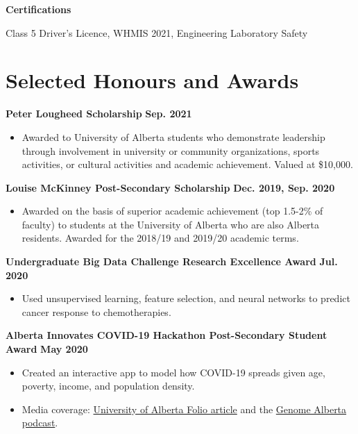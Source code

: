 \documentclass{article}
\begin{document}
\textbf{Certifications} \hfill \parbox[t]{.8\linewidth}{Class 5 Driver's Licence, WHMIS 2021, Engineering Laboratory Safety}


\section*{\textcolor{my_colour}{Selected Honours and Awards}}
\vspace{-.25em} \hrulefill \vspace{.25em}

\textbf{Peter Lougheed Scholarship} \hfill \textbf{Sep. 2021}
\begin{itemize}
    \item Awarded to University of Alberta students who demonstrate leadership through involvement in university or community organizations, sports activities, or cultural activities and academic achievement. Valued at \$10,000.
\end{itemize} \vspace{1em}

\textbf{Louise McKinney Post-Secondary Scholarship} \hfill \textbf{Dec. 2019, Sep. 2020}
\begin{itemize}
    \item Awarded on the basis of superior academic achievement (top 1.5-2\% of faculty) to students at the University of Alberta who are also Alberta residents. Awarded for the 2018/19 and 2019/20 academic terms.
\end{itemize} \vspace{1em}

\textbf{Undergraduate Big Data Challenge Research Excellence Award} \hfill \textbf{Jul. 2020}
\begin{itemize}
    \item Used unsupervised learning, feature selection, and neural networks to predict cancer response to chemotherapies.
\end{itemize} \vspace{1em}

\textbf{Alberta Innovates COVID-19 Hackathon Post-Secondary Student Award} \hfill \textbf{May 2020}
\begin{itemize}
    \item Created an interactive app to model how COVID-19 spreads given age, poverty, income, and population density.
    \item Media coverage: \href{https://www.folio.ca/students-develop-online-tool-to-predict-covid-19-spread-based-on-demographics/}{University of Alberta Folio article} and the \href{https://genomealberta.ca/genomics/genomics_blog_08182001.aspx}{Genome Alberta podcast}.
\end{itemize} \vspace{1em}
\end{document}
